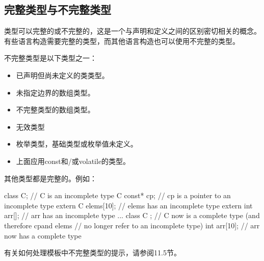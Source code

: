 \subsection{完整类型与不完整类型}

类型可以完整的或不完整的，这是一个与声明和定义之间的区别密切相关的概念。有些语言构造需要完整的类型，而其他语言构造也可以使用不完整的类型。

不完整类型是以下类型之一：

\begin{itemize}
\item 
已声明但尚未定义的类类型。

\item 
未指定边界的数组类型。

\item 
不完整类型的数组类型。

\item 
无效类型

\item 
枚举类型，基础类型或枚举值未定义。

\item 
上面应用const和/或volatile的类型。
\end{itemize}

其他类型都是完整的。例如：

\begin{cpp}
class C; // C is an incomplete type
C const* cp; // cp is a pointer to an incomplete type
extern C elems[10]; // elems has an incomplete type
extern int arr[]; // arr has an incomplete type
...
class C { }; // C now is a complete type (and therefore cpand elems
			 // no longer refer to an incomplete type)
int arr[10]; // arr now has a complete type
\end{cpp}

有关如何处理模板中不完整类型的提示，请参阅11.5节。























